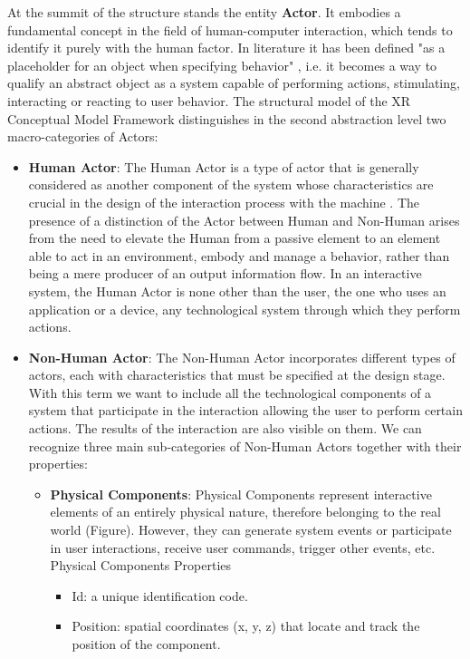 At the summit of the structure stands the entity \textbf{Actor}. It embodies a fundamental concept in the field of human-computer interaction, which tends to identify it purely with the human factor. In literature it has been defined "as a placeholder for an object when specifying behavior" \cite{de_troyer_conceptual_2007}, i.e. it becomes a way to qualify an abstract object as a system capable of performing actions, stimulating, interacting or reacting to user behavior. The structural model of the XR Conceptual Model Framework distinguishes in the second abstraction level two macro-categories of Actors: 
\begin{itemize}
    \item \textbf{Human Actor}: The Human Actor is a type of actor that is generally considered as another component of the system whose characteristics are crucial in the design of the interaction process with the machine \cite{bannon_discovering_1989}. The presence of a distinction of the Actor between Human and Non-Human arises from the need to elevate the Human from a passive element to an element able to act in an environment, embody and manage a behavior, rather than being a mere producer of an output information flow. In an interactive system, the Human Actor is none other than the user, the one who uses an application or a device, any technological system through which they perform actions. 
    \item \textbf{Non-Human Actor}: The Non-Human Actor incorporates different types of actors, each with characteristics that must be specified at the design stage. With this term we want to include all the technological components of a system that participate in the interaction allowing the user to perform certain actions. The results of the interaction are also visible on them.  We can recognize three main sub-categories of Non-Human Actors together with their properties:
    \begin{itemize}
        \item \textbf{Physical Components}: Physical Components represent interactive elements of an entirely physical nature, therefore belonging to the real world (Figure). However, they can generate system events or participate in user interactions, receive user commands, trigger other events, etc. \\
        Physical Components Properties
        \begin{itemize}
            \item Id: a unique identification code.
            \item Position: spatial coordinates (x, y, z) that locate and track the position of the component.

\end{itemize}
\end{itemize}
\end{itemize}
